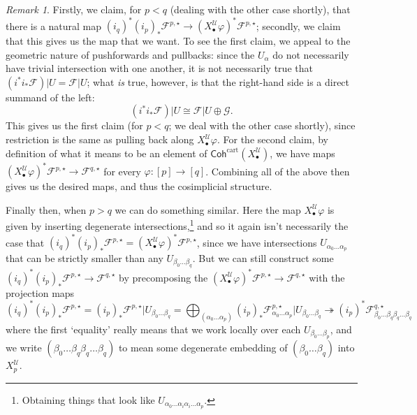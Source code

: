 \documentclass[11pt,fleqn]{article}
\theoremstyle{plain}
\theoremstyle{definition}
\theoremstyle{remark}
\newtheorem{remark}[theorem]{Remark}
\numberwithin{equation}{theorem}
\newcommand{\cover}{\mathcal{U}}
\newcommand{\anotherbullet}{\star}
\newcommand{\restricted}{\mathbin{\big\vert}}
\newcommand{\cartcohX}{\mathsf{Coh}^\mathrm{cart}(X_\bullet^\cover)}
\newcommand{\nerve}[1]{X_{#1}^\cover}
\begin{document}
\begin{remark}
            Firstly, we claim, for $p<q$ (dealing with the other case shortly), that there is a natural map $(i_q)^*(i_p)_*\mathcal{F}^{p,\anotherbullet} \rightarrow (\nerve{\bullet}\varphi)^*\mathcal{F}^{p,\anotherbullet}$; secondly, we claim that this gives us the map that we want.
            To see the first claim, we appeal to the geometric nature of pushforwards and pullbacks: since the $U_\alpha$ do not necessarily have trivial intersection with one another, it is not necessarily true that $(i^*i_*\mathcal{F})\restricted U = \mathcal{F}\restricted U$; what \emph{is} true, however, is that the right-hand side is a direct summand of the left:
            \[
                (i^*i_*\mathcal{F})\restricted U
                \cong
                \mathcal{F}\restricted U
                \oplus
                \mathcal{G}.
            \]
            This gives us the first claim (for $p<q$; we deal with the other case shortly), since restriction is the same as pulling back along $\nerve{\bullet}\varphi$.
            For the second claim, by definition of what it means to be an element of $\cartcohX$, we have maps $(\nerve{\bullet}\varphi)^*\mathcal{F}^{p,\anotherbullet}\to\mathcal{F}^{q,\anotherbullet}$ for every $\varphi\colon[p]\to[q]$.
            Combining all of the above then gives us the desired maps, and thus the cosimplicial structure.

            Finally then, when $p>q$ we can do something similar.
            Here the map $\nerve{\bullet}\varphi$ is given by inserting degenerate intersections,\footnote{Obtaining things that look like $U_{\alpha_0\ldots\alpha_i\alpha_i\ldots\alpha_p}$.} and so it again isn't necessarily the case that $(i_q)^*(i_p)_*\mathcal{F}^{p,\anotherbullet} = (\nerve{\bullet}\varphi)^*\mathcal{F}^{p,\anotherbullet}$, since we have intersections $U_{\alpha_0\ldots\alpha_p}$ that can be strictly smaller than any $U_{\beta_0\ldots\beta_q}$.
            But we can still construct some $(i_q)^*(i_p)_*\mathcal{F}^{p,\anotherbullet} \to \mathcal{F}^{q,\anotherbullet}$ by precomposing the $(\nerve{\bullet}\varphi)^*\mathcal{F}^{p,\anotherbullet}\to\mathcal{F}^{q,\anotherbullet}$ with the projection maps
            \[
                (i_q)^*(i_p)_*\mathcal{F}^{p,\anotherbullet}
                =
                (i_p)_*\mathcal{F}^{p,\anotherbullet}\restricted U_{\beta_0\ldots\beta_q}
                =
                \bigoplus_{(\alpha_0\ldots\alpha_p)} (i_p)_*\mathcal{F}_{\alpha_0\ldots\alpha_p}^{p,\anotherbullet} \restricted U_{\beta_0\ldots\beta_q}
                \twoheadrightarrow
                (i_p)^*\mathcal{F}_{\beta_0\ldots\beta_q\beta_q\ldots\beta_q}^{q,\anotherbullet}
            \]
            where the first `equality' really means that we work locally over each $U_{\beta_0\ldots\beta_p}$, and we write $(\beta_0\ldots\beta_q\beta_q\ldots\beta_q)$ to mean some degenerate embedding of $(\beta_0\ldots\beta_q)$ into $\nerve{p}$.
        \end{remark}
\end{document}

